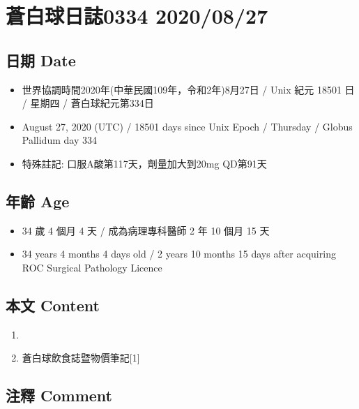 \documentclass[a5paper, 11pt
]{book}
\providecommand{\tightlist}{%
  \setlength{\itemsep}{0pt}\setlength{\parskip}{0pt}}
\begin{document}
\hypertarget{ux84bcux767dux7403ux65e5ux8a8c0334-20200827}{%
\section{蒼白球日誌0334
2020/08/27}\label{ux84bcux767dux7403ux65e5ux8a8c0334-20200827}}

\hypertarget{ux65e5ux671f-date-87}{%
\subsection{日期 Date}\label{ux65e5ux671f-date-87}}

\begin{itemize}
\tightlist
\item
  世界協調時間2020年(中華民國109年，令和2年)8月27日 / Unix 紀元 18501 日
  / 星期四 / 蒼白球紀元第334日
\item
  August 27, 2020 (UTC) / 18501 days since Unix Epoch / Thursday /
  Globus Pallidum day 334
\item
  特殊註記: 口服A酸第117天，劑量加大到20mg QD第91天
\end{itemize}

\hypertarget{ux5e74ux9f61-age-87}{%
\subsection{年齡 Age}\label{ux5e74ux9f61-age-87}}

\begin{itemize}
\tightlist
\item
  34 歲 4 個月 4 天 / 成為病理專科醫師 2 年 10 個月 15 天
\item
  34 years 4 months 4 days old / 2 years 10 months 15 days after
  acquiring ROC Surgical Pathology Licence
\end{itemize}

\hypertarget{ux672cux6587-content-87}{%
\subsection{本文 Content}\label{ux672cux6587-content-87}}

\begin{enumerate}
\def\labelenumi{\arabic{enumi}.}
\tightlist
\item
\item
  蒼白球飲食誌暨物價筆記{[}1{]}
\end{enumerate}

\hypertarget{ux6ce8ux91cb-comment-87}{%
\subsection{注釋 Comment}\label{ux6ce8ux91cb-comment-87}}
\end{document}
